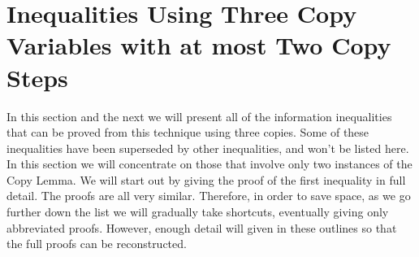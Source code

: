 \documentclass[10pt,journal]{IEEEtran}
\begin{document}

\section{Inequalities Using Three Copy Variables with at most Two Copy Steps}\label{ThreeCopies}

In this section and the next we will present all of the information inequalities that can be proved from this technique
using three copies.  Some of these inequalities have been superseded by other inequalities, and won't be
listed here.  In this section we will concentrate on those that involve only two instances of the Copy Lemma.
We will start out by giving the proof of the first inequality in full detail.  The proofs are all very similar.  Therefore, in order to
save space, as we go further down the list we will gradually take shortcuts, eventually giving only abbreviated proofs.
However, enough detail will given in these outlines so that the full proofs can be reconstructed.
\end{document}
